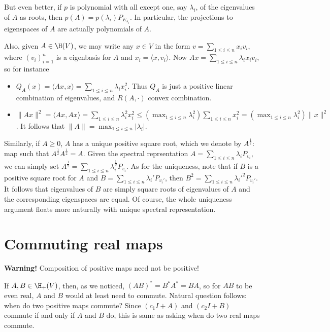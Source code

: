 But even better, if $p$ is polynomial with all except one, say $\lambda_{i}$, of the eigenvalues of $A$ as roots, then $p(A) = p(\lambda_{i}) P_{E_{\lambda_{i}}}$. In particular, the projections to eigenspaces of $A$ are actually polynomials of $A$.

Also, given $A \in \H(V)$, we may write any $x \in V$ in the form $v = \sum_{1 \leq i \leq n} x_{i} v_{i}$, where $(v_{i})_{i = 1}^{n}$ is a eigenbasis for $A$ and $x_{i} = \langle x, v_{i} \rangle$. Now $A x = \sum_{1 \leq i \leq n} \lambda_{i} x_{i} v_{i}$, so for instance

\begin{itemize}
\item $Q_{A}(x) = \langle A x, x \rangle = \sum_{1 \leq i \leq n} \lambda_{i} x_{i}^{2}$. Thus $Q_{A}$ is just a positive linear combination of eigenvalues, and $R(A, \cdot)$ convex combination.
\item $\|A x\|^{2} = \langle A x, A x \rangle = \sum_{1 \leq i \leq n} \lambda_{i}^{2} x_{i}^{2} \leq \left(\max_{1 \leq i \leq n} \lambda_{i}^2 \right) \sum_{1 \leq i \leq n} x_{i}^2 = \left(\max_{1 \leq i \leq n} \lambda_{i}^2 \right) \|x\|^{2}$. It follows that $\|A\| = \max_{1 \leq i \leq n} |\lambda_{i}|$.
\end{itemize}

Similarly, if $A \geq 0$, $A$ has a unique positive square root, which we denote by $A^{\frac{1}{2}}$: map such that $A^{\frac{1}{2}} A^{\frac{1}{2}} = A$. Given the spectral reprsentation $A = \sum_{1 \leq i \leq n} \lambda_{i} P_{v_{i}}$, we can simply set $A^{\frac{1}{2}} = \sum_{1 \leq i \leq n} \lambda_{i}^{\frac{1}{2}} P_{v_{i}}$. As for the uniqueness, note that if $B$ is a positive square root for $A$ and $B = \sum_{1 \leq i \leq n} \lambda_{i}' P_{v_{i}'}$, then $B^2 = \sum_{1 \leq i \leq n} \lambda_{i}'^{2} P_{v_{i}'}$. It follows that eigenvalues of $B$ are simply square roots of eigenvalues of $A$ and the corresponding eigenspaces are equal. Of course, the whole uniqueness argument floats more naturally with unique spectral representation.

\section{Commuting real maps}

\textbf{Warning!} Composition of positive maps need not be positive!

If $A, B \in \H_{+}(V)$, then, as we noticed, $(A B)^{*} = B^{*} A^{*} = B A$, so for $A B$ to be even real, $A$ and $B$ would at least need to commute. Natural question follows: when do two positive maps commute? Since $(c_{1} I + A)$ and $(c_{2} I + B)$ commute if and only if $A$ and $B$ do, this is same as asking when do two real maps commute.

